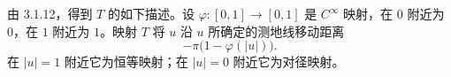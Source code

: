 由 3.1.12，得到 $T$ 的如下描述。设 $\varphi:[0,1]\to[0,1]$ 是 $C^\infty$ 映射，在 $0$ 附近为 $0$，在 $1$ 附近为 $1$。映射 $T$ 将 $u$ 沿 $u$ 所确定的测地线移动距离
\[
-\pi\bigl(1-\varphi(|u|)\bigr).
\]
在 $|u|=1$ 附近它为恒等映射；在 $|u|=0$ 附近它为对径映射。